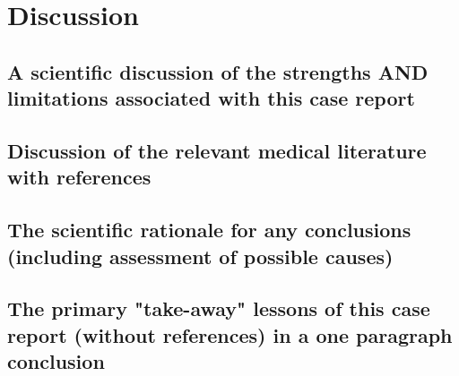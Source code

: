 \section{Discussion}
\subsection{A scientific discussion of the strengths AND limitations associated with this case report}
\subsection{Discussion of the relevant medical literature with references}
\subsection{The scientific rationale for any conclusions (including assessment of possible causes)}
\subsection{The primary "take-away" lessons of this case report (without references) in a one paragraph conclusion}
